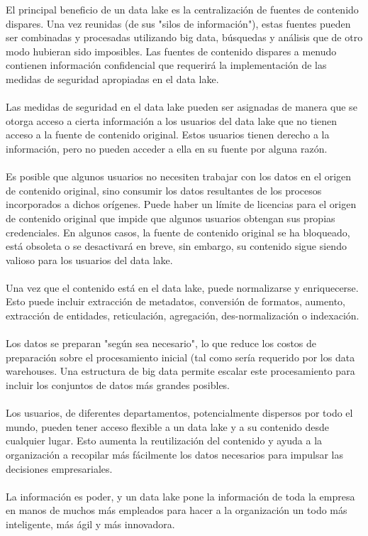 \documentclass[11pt,a4paper]{article}
\begin{document}
			El principal beneficio de un data lake es la centralización de fuentes de contenido dispares. Una vez reunidas (de sus "silos de información"), estas fuentes pueden ser combinadas y procesadas utilizando big data, búsquedas y análisis que de otro modo hubieran sido imposibles. Las fuentes de contenido dispares a menudo contienen información confidencial que requerirá la implementación de las medidas de seguridad apropiadas en el data lake.\\
			\\
			Las medidas de seguridad en el data lake pueden ser asignadas de manera que se otorga acceso a cierta información a los usuarios del data lake que no tienen acceso a la fuente de contenido original. Estos usuarios tienen derecho a la información, pero no pueden acceder a ella en su fuente por alguna razón.\\
			\\
			Es posible que algunos usuarios no necesiten trabajar con los datos en el origen de contenido original, sino consumir los datos resultantes de los procesos incorporados a dichos orígenes. Puede haber un límite de licencias para el origen de contenido original que impide que algunos usuarios obtengan sus propias credenciales. En algunos casos, la fuente de contenido original se ha bloqueado, está obsoleta o se desactivará en breve, sin embargo, su contenido sigue siendo valioso para los usuarios del data lake.\\
			\\
			Una vez que el contenido está en el data lake, puede normalizarse y enriquecerse. Esto puede incluir extracción de metadatos, conversión de formatos, aumento, extracción de entidades, reticulación, agregación, des-normalización o indexación.\\
			\\
			Los datos se preparan "según sea necesario", lo que reduce los costos de preparación sobre el procesamiento inicial (tal como sería requerido por los data warehouses. Una estructura de big data permite escalar este procesamiento para incluir los conjuntos de datos más grandes posibles.\\
			\\
			Los usuarios, de diferentes departamentos, potencialmente dispersos por todo el mundo, pueden tener acceso flexible a un data lake y a su contenido desde cualquier lugar. Esto aumenta la reutilización del contenido y ayuda a la organización a recopilar más fácilmente los datos necesarios para impulsar las decisiones empresariales.\\
			\\
			La información es poder, y un data lake pone la información de toda la empresa en manos de muchos más empleados para hacer a la organización un todo más inteligente, más ágil y más innovadora.
\end{document}
